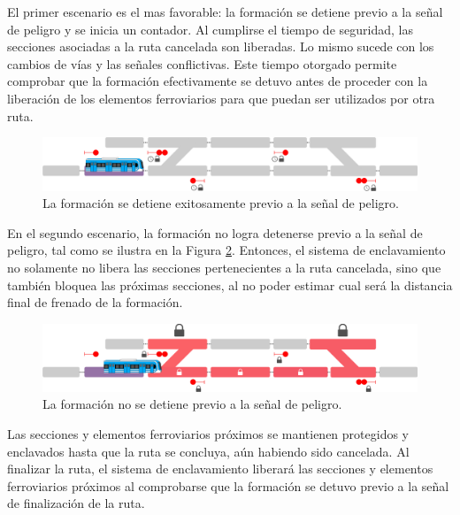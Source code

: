     El primer escenario es el mas favorable: la formación se detiene previo a la señal de peligro y se inicia un contador. Al cumplirse el tiempo de seguridad, las secciones asociadas a la ruta cancelada son liberadas. Lo mismo sucede con los cambios de vías y las señales conflictivas. Este tiempo otorgado permite comprobar que la formación efectivamente se detuvo antes de proceder con la liberación de los elementos ferroviarios para que puedan ser utilizados por otra ruta.
    
    \begin{figure}[!h]
        \centering
        \includegraphics[width=1\textwidth]{Figuras/aproximacion_3}
        \centering\caption{La formación se detiene exitosamente previo a la señal de peligro.}
        \label{fig:ACG_aproximacion_3}
    \end{figure}
    
	En el segundo escenario, la formación no logra detenerse previo a la señal de peligro, tal como se ilustra en la Figura \ref{fig:ACG_aproximacion_4}. Entonces, el sistema de enclavamiento no solamente no libera las secciones pertenecientes a la ruta cancelada, sino que también bloquea las próximas secciones, al no poder estimar cual será la distancia final de frenado de la formación.

    \begin{figure}[!h]
        \centering
        \includegraphics[width=1\textwidth]{Figuras/aproximacion_4}
        \centering\caption{La formación no se detiene previo a la señal de peligro.}
        \label{fig:ACG_aproximacion_4}
    \end{figure}
    
	Las secciones y elementos ferroviarios próximos se mantienen protegidos y enclavados hasta que la ruta se concluya, aún habiendo sido cancelada. Al finalizar la ruta, el sistema de enclavamiento liberará las secciones y elementos ferroviarios próximos al comprobarse que la formación se detuvo previo a la señal de finalización de la ruta.
	